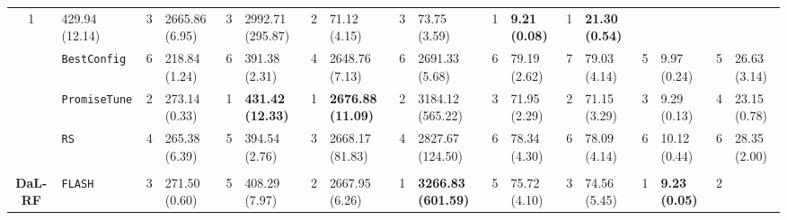 \begin{tabular}{clllllllllllllllll}
  \cellcolor{blue!15}1 &
  \multicolumn{1}{l|}{\cellcolor{blue!15}429.94 (12.14)} &
  3 &
  \multicolumn{1}{l|}{2665.86 (6.95)} &
  3 &
  \multicolumn{1}{l|}{2992.71 (295.87)} &
  2 &
  \multicolumn{1}{l|}{71.12 (4.15)} &
  3 &
  \multicolumn{1}{l|}{73.75 (3.59)} &
  \cellcolor{blue!15}1 &
  \multicolumn{1}{l|}{\cellcolor{blue!15}\textbf{9.21 (0.08)}} &
  \cellcolor{blue!15}1 &
  \cellcolor{blue!15}\textbf{21.30 (0.54)} \\
\multicolumn{1}{c|}{} &
  \multicolumn{1}{l|}{\texttt{BestConfig}} &
  6 &
  \multicolumn{1}{l|}{218.84 (1.24)} &
  6 &
  \multicolumn{1}{l|}{391.38 (2.31)} &
  4 &
  \multicolumn{1}{l|}{2648.76 (7.13)} &
  6 &
  \multicolumn{1}{l|}{2691.33 (5.68)} &
  6 &
  \multicolumn{1}{l|}{79.19 (2.62)} &
  7 &
  \multicolumn{1}{l|}{79.03 (4.14)} &
  5 &
  \multicolumn{1}{l|}{9.97 (0.24)} &
  5 &
  26.63 (3.14) \\
\multicolumn{1}{c|}{} &
  \multicolumn{1}{l|}{\texttt{PromiseTune}} &
  2 &
  \multicolumn{1}{l|}{273.14 (0.33)} &
  \cellcolor{blue!15}1 &
  \multicolumn{1}{l|}{\cellcolor{blue!15}\textbf{431.42 (12.33)}} &
  \cellcolor{blue!15}1 &
  \multicolumn{1}{l|}{\cellcolor{blue!15}\textbf{2676.88 (11.09)}} &
  2 &
  \multicolumn{1}{l|}{3184.12 (565.22)} &
  3 &
  \multicolumn{1}{l|}{71.95 (2.29)} &
  2 &
  \multicolumn{1}{l|}{71.15 (3.29)} &
  3 &
  \multicolumn{1}{l|}{9.29 (0.13)} &
  4 &
  23.15 (0.78) \\
\multicolumn{1}{c|}{} &
  \multicolumn{1}{l|}{\texttt{RS}} &
  4 &
  \multicolumn{1}{l|}{265.38 (6.39)} &
  5 &
  \multicolumn{1}{l|}{394.54 (2.76)} &
  3 &
  \multicolumn{1}{l|}{2668.17 (81.83)} &
  4 &
  \multicolumn{1}{l|}{2827.67 (124.50)} &
  6 &
  \multicolumn{1}{l|}{78.34 (4.30)} &
  6 &
  \multicolumn{1}{l|}{78.09 (4.14)} &
  6 &
  \multicolumn{1}{l|}{10.12 (0.44)} &
  6 &
  28.35 (2.00) \\
\hline
\multicolumn{1}{l}{\textbf{}} &
    &
    &
    &
    &
    &
    &
    &
    &
    &
    &
    &
    &
    &
    &
    &
    &
    \\ \hline
\multicolumn{1}{c|}{\multirow{7}{*}{\textbf{DaL-RF}}} &
  \multicolumn{1}{l|}{\texttt{FLASH}} &
  3 &
  \multicolumn{1}{l|}{271.50 (0.60)} &
  5 &
  \multicolumn{1}{l|}{408.29 (7.97)} &
  2 &
  \multicolumn{1}{l|}{2667.95 (6.26)} &
  \cellcolor{blue!15}1 &
  \multicolumn{1}{l|}{\cellcolor{blue!15}\textbf{3266.83 (601.59)}} &
  5 &
  \multicolumn{1}{l|}{75.72 (4.10)} &
  3 &
  \multicolumn{1}{l|}{74.56 (5.45)} &
  \cellcolor{blue!15}1 &
  \multicolumn{1}{l|}{\cellcolor{blue!15}\textbf{9.23 (0.05)}} &
  2 &

\end{tabular}
